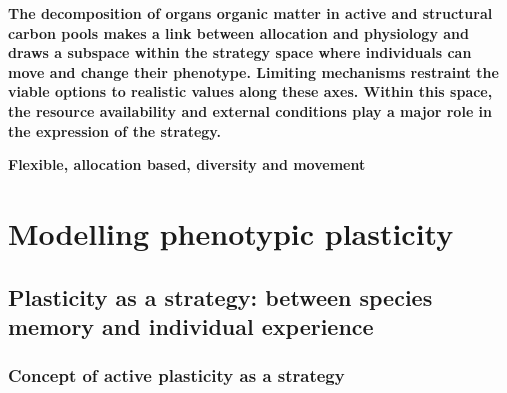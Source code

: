 



\textbf{The decomposition of organs organic matter in active and structural carbon pools makes a link between allocation and physiology and draws a subspace within the strategy space where individuals can move and change their phenotype. Limiting mechanisms restraint the viable options to realistic values along these axes. Within this space, the resource availability and external conditions play a major role in the expression of the strategy.\\ %
}


\textbf{Flexible, allocation based, diversity and movement}

\chapter{Modelling phenotypic plasticity}\label{chapter:modelling_PP}


\section{Plasticity as a strategy: between species memory and individual experience}

\subsection{Concept of active plasticity as a strategy}
